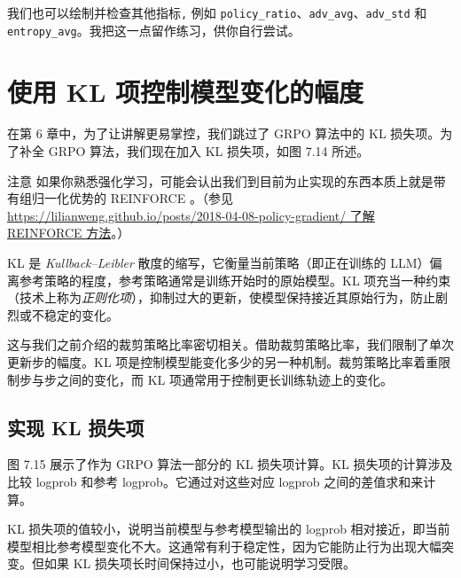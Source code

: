 
我们也可以绘制并检查其他指标\texttt{,} 例如 \texttt{policy\_ratio}、\texttt{adv\_avg}、\texttt{adv\_std} 和 \texttt{entropy\_avg}。我把这一点留作练习，供你自行尝试。

\section{使用 KL 项控制模型变化的幅度}

在第 6 章中，为了让讲解更易掌控，我们跳过了 GRPO 算法中的 KL 损失项。为了补全 GRPO 算法，我们现在加入 KL 损失项，如图 7.14 所述。


\begin{myWarning}{注意}
 如果你熟悉强化学习，可能会认出我们到目前为止实现的东西本质上就是带有组归一化优势的 REINFORCE\emph{ }。（参见 \href{https://lilianweng.github.io/posts/2018-04-08-policy-gradient/}{https://lilianweng.github.io/posts/2018-04-08-policy-gradient/ 了解 REINFORCE 方法}。）\end{myWarning}

KL 是 \emph{Kullback–Leibler }散度的缩写，它衡量当前策略（即正在训练的 LLM）偏离参考策略的程度，参考策略通常是训练开始时的原始模型。KL 项充当一种约束（技术上称为\emph{正则化项}），抑制过大的更新，使模型保持接近其原始行为，防止剧烈或不稳定的变化。

这与我们之前介绍的裁剪策略比率密切相关。借助裁剪策略比率，我们限制了单次更新步的幅度。KL 项是控制模型能变化多少的另一种机制。裁剪策略比率着重限制步与步之间的变化，而 KL 项通常用于控制更长训练轨迹上的变化。

\subsection{实现 KL 损失项}

图 7.15 展示了作为 GRPO 算法一部分的 KL 损失项计算。KL 损失项的计算涉及比较 logprob 和参考 logprob。它通过对这些对应 logprob 之间的差值求和来计算。


KL 损失项的值较小，说明当前模型与参考模型输出的 logprob 相对接近，即当前模型相比参考模型变化不大。这通常有利于稳定性，因为它能防止行为出现大幅突变。但如果 KL 损失项长时间保持过小，也可能说明学习受限。

